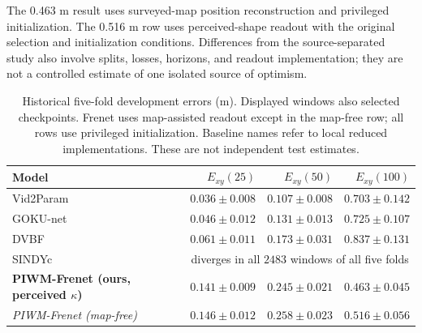 \documentclass[preprint,12pt]{elsarticle}
\begin{document}
The 0.463 m result uses surveyed-map position reconstruction and privileged
initialization. The 0.516 m row uses perceived-shape readout with the original
selection and initialization conditions. Differences from the source-separated
study also involve splits, losses, horizons, and readout implementation; they
are not a controlled estimate of one isolated source of optimism.
\begin{table}[t]
\centering
\caption{Historical five-fold development errors (m). Displayed windows also selected checkpoints. Frenet uses map-assisted readout except in the map-free row; all rows use privileged initialization. Baseline names refer to local reduced implementations. These are not independent test estimates.}
\label{tab:donkey_main}
\footnotesize
\setlength{\tabcolsep}{3.4pt}
\begin{tabular}{lrrr}
\toprule
Model & $E_{xy}(25)$ & $E_{xy}(50)$ & $E_{xy}(100)$ \\
\midrule
Vid2Param~\cite{asenov2019vid2param}   & $\mathbf{0.036 \pm 0.008}$ & $\mathbf{0.107 \pm 0.008}$ & $0.703 \pm 0.142$ \\
GOKU-net~\cite{linial_generative_2021}  & $0.046 \pm 0.012$ & $0.131 \pm 0.013$ & $0.725 \pm 0.107$ \\
DVBF~\cite{karl2016deep}               & $0.061 \pm 0.011$ & $0.173 \pm 0.031$ & $0.837 \pm 0.131$ \\
SINDYc~\cite{BRUNTON2016710}           & \multicolumn{3}{c}{diverges in all $2483$ windows of all five folds} \\
\midrule
\textbf{PIWM-Frenet (ours, perceived $\kappa$)} & $0.141 \pm 0.009$ & $0.245 \pm 0.021$ & $\mathbf{0.463 \pm 0.045}$ \\
\emph{PIWM-Frenet (map-free)} & \emph{$0.146 \pm 0.012$} & \emph{$0.258 \pm 0.023$} & \emph{$0.516 \pm 0.056$} \\
\bottomrule
\end{tabular}
\end{table}
\end{document}
